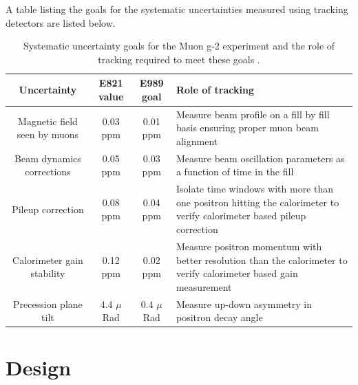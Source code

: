 A table listing the goals for the systematic uncertainties measured using tracking detectors are listed below.

\begin{table}[h!]
\begin{center}
 \begin{tabular}{||c | c | c | m{5cm}||} 
 \hline
 Uncertainty & E821 value & E989 goal & Role of tracking \\ [0.5ex] 
 \hline\hline
 Magnetic field seen by muons & 0.03 ppm & 0.01 ppm
 & Measure beam profile on a fill by fill basis ensuring proper muon beam alignment \\ 
 \hline
 Beam dynamics corrections & 0.05 ppm & 0.03 ppm & Measure beam oscillation parameters as a function of time in the fill \\
 \hline
 Pileup correction & 0.08 ppm & 0.04 ppm & Isolate time windows with more than one positron hitting the calorimeter to verify calorimeter based pileup correction \\
 \hline
 Calorimeter gain stability & 0.12 ppm & 0.02 ppm & Measure positron momentum with better resolution than the calorimeter to verify calorimeter based gain measurement \\
 \hline
 Precession plane tilt & 4.4 $\mu$Rad & 0.4 $\mu$Rad & Measure up-down asymmetry in positron decay angle \\ [1ex] 
 \hline
\end{tabular}
\caption{Systematic uncertainty goals for the Muon g-2 experiment and the role of tracking required to meet these goals \cite{Reference29}.}
\label{table:1}
\end{center}
\end{table}

\section{Design}


